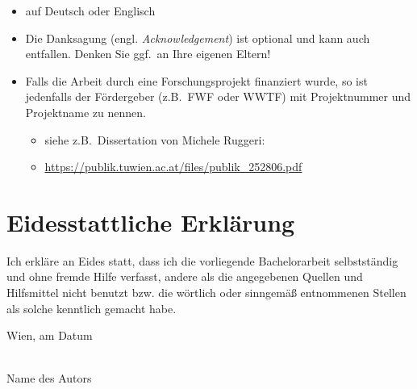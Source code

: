 \documentclass[a4paper,11pt,bibliography=totoc,listof=totoc,headinclude=true,cleardoublepage=empty,oneside]{NumPDEsThesis}
\begin{document}
\begin{itemize}
\item auf Deutsch oder Englisch
\item Die Danksagung (engl. {\em Acknowledgement}) ist optional und kann auch entfallen. Denken Sie ggf.\ an Ihre eigenen Eltern!

\item Falls die Arbeit durch eine Forschungsprojekt finanziert wurde, so ist jedenfalls der Fördergeber (z.B.\ FWF oder WWTF) mit Projektnummer und Projektname zu nennen.
\begin{itemize}
\item siehe z.B.\ Dissertation von Michele Ruggeri:
\item[] \href{https://publik.tuwien.ac.at/files/publik_252806.pdf}{\ttfamily https://publik.tuwien.ac.at/files/publik\_252806.pdf}
\end{itemize}

\end{itemize}

\cleardoublepage


\chapter*{Eidesstattliche Erkl\"arung}
\thispagestyle{empty}

\vspace*{2cm}

Ich erkl\"are an Eides statt, dass ich die vorliegende Bachelorarbeit selbstst\"andig und ohne fremde Hilfe verfasst, andere als die angegebenen Quellen und Hilfsmittel nicht benutzt bzw. die w\"ortlich oder sinngem\"a{\ss} entnommenen Stellen als solche kenntlich gemacht habe.

\vspace*{3cm}

\noindent
Wien, am {\color{change}Datum} %
%
\hfill 
%
\begin{minipage}[t]{5cm}
\centering
\underline{\hspace*{5cm}}\\
\small\color{change}Name des Autors
\end{minipage}

\cleardoublepage
\end{document}
